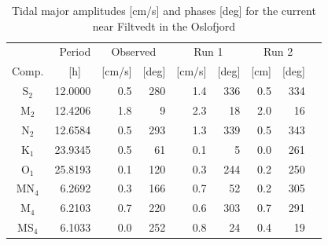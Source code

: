 \begin{table}[ht]
\caption{Tidal major amplitudes [cm/s] and phases [deg] for the current near Filtvedt in the Oslofjord}
\label{tab:Filtvedt}
\centering
\begin{tabular}{crrrrrrrr} \hline
      & Period & \multicolumn{2}{c}{Observed} & \multicolumn{2}{c}{Run 1} & \multicolumn{2}{c}{Run 2} \\
Comp. & [h] $\;\;$ & [cm/s] & [deg] & [cm/s] & [deg] & [cm] & [deg] \\ \hline 
S$_2$  & 12.0000 &  0.5 & 280  &   1.4 & 336  &  0.5 & 334  \\
M$_2$  & 12.4206 &  1.8 &   9  &   2.3 &  18  &  2.0 &  16  \\
N$_2$  & 12.6584 &  0.5 & 293  &   1.3 & 339  &  0.5 & 343  \\
K$_1$  & 23.9345 &  0.5 &  61  &   0.1 &   5  &  0.0 & 261  \\
O$_1$  & 25.8193 &  0.1 & 120  &   0.3 & 244  &  0.2 & 250  \\
MN$_4$ &  6.2692 &  0.3 & 166  &   0.7 &  52  &  0.2 & 305  \\
M$_4$  &  6.2103 &  0.7 & 220  &   0.6 & 303  &  0.7 & 291  \\
MS$_4$ &  6.1033 &  0.0 & 252  &   0.8 &  24  &  0.4 &  19  \\ \hline 
\end{tabular}
\end{table}

